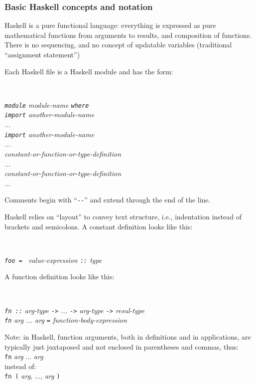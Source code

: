 \documentclass[11pt]{article}
\newcommand{\hmmmm}{\hspace*{4em}}
\begin{document}
\subsubsection{Basic Haskell concepts and notation}

Haskell is a pure functional language: everything is expressed as pure
mathematical functions from arguments to results, and composition of
functions.  There is no sequencing, and no concept of updatable
variables (traditional ``assignment statement'')

Each Haskell file is a Haskell module and has the form:

\hmmmm \
\begin{minipage}[t]{4in}\it
{\tt module} module-name {\tt where} \\
{\tt import} another-module-name \\
... \\
{\tt import} another-module-name \\
... \\
constant-or-function-or-type-definition \\
... \\
constant-or-function-or-type-definition \\
...
\end{minipage}

Comments begin with ``\verb|--|'' and extend through the end of the line.

Haskell relies on ``layout'' to convey text structure, i.e.,
indentation instead of brackets and semicolons. A constant definition
looks like this:

\hmmmm \
\begin{minipage}[t]{4in}\it
{\tt foo = } value-expression {\tt ::} type
\end{minipage}

A function definition looks like this:

\hmmmm \
\begin{minipage}[t]{4in}\it
{\tt fn ::} arg-type {\tt ->} ... {\tt ->} arg-type {\tt ->} resul-type \\
{\tt fn} arg ... arg {\tt  =} function-body-expression
\end{minipage}

Note: in Haskell, function arguments, both in definitions
and in applications, are typically just juxtaposed and not enclosed in
parentheses and commas, thus: \\
\hspace*{2in} {\tt fn} \emph{arg} ... \emph{arg} \\
instead of: \\
\hspace*{2in} {\tt fn (} \emph{arg}, ..., \emph{arg} {\tt )}
\end{document}
